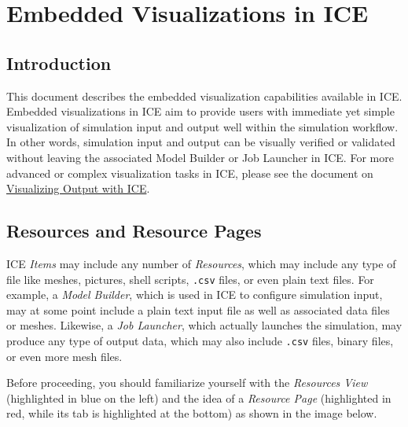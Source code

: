 \chapter{Embedded Visualizations in ICE}
\label{sec:embeddedViz}

\section{Introduction}\label{introduction}

This document describes the embedded visualization capabilities
available in ICE. Embedded visualizations in ICE aim to provide users
with immediate yet simple visualization of simulation input and output
well within the simulation workflow. In other words, simulation input
and output can be visually verified or validated without leaving the
associated Model Builder or Job Launcher in ICE. For more advanced or
complex visualization tasks in ICE, please see the document on
\href{Visualizing Output with ICE}{Visualizing Output with ICE}.

\section{Resources and Resource
Pages}\label{resources-and-resource-pages}

ICE \emph{Items} may include any number of \emph{Resources}, which may
include any type of file like meshes, pictures, shell scripts,
\texttt{.csv} files, or even plain text files. For example, a
\emph{Model Builder}, which is used in ICE to configure simulation
input, may at some point include a plain text input file as well as
associated data files or meshes. Likewise, a \emph{Job Launcher}, which
actually launches the simulation, may produce any type of output data,
which may also include \texttt{.csv} files, binary files, or even more
mesh files.

Before proceeding, you should familiarize yourself with the
\emph{Resources View} (highlighted in blue on the left) and the idea of
a \emph{Resource Page} (highlighted in red, while its tab is highlighted
at the bottom) as shown in the image below.

